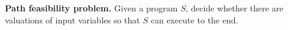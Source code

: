 \noindent
\textbf{Path feasibility problem.} Given a {\slint} program $S$, decide whether there are valuations of input variables so that $S$ can execute to the end.

%

















